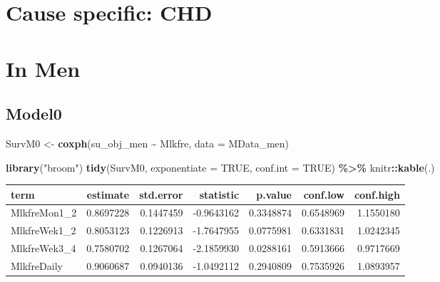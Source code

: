 \documentclass[
]{article}
\newenvironment{Shaded}{\begin{snugshade}}{\end{snugshade}}
\newcommand{\CommentTok}[1]{\textcolor[rgb]{0.56,0.35,0.01}{\textit{#1}}}
\newcommand{\DataTypeTok}[1]{\textcolor[rgb]{0.13,0.29,0.53}{#1}}
\newcommand{\KeywordTok}[1]{\textcolor[rgb]{0.13,0.29,0.53}{\textbf{#1}}}
\newcommand{\NormalTok}[1]{#1}
\newcommand{\OperatorTok}[1]{\textcolor[rgb]{0.81,0.36,0.00}{\textbf{#1}}}
\newcommand{\OtherTok}[1]{\textcolor[rgb]{0.56,0.35,0.01}{#1}}
\newcommand{\StringTok}[1]{\textcolor[rgb]{0.31,0.60,0.02}{#1}}
\begin{document}
\hypertarget{cause-specific-chd}{%
\section{Cause specific: CHD}\label{cause-specific-chd}}

\begin{Shaded}
\end{Shaded}

\hypertarget{in-men-3}{%
\section{In Men}\label{in-men-3}}

\hypertarget{model0-7}{%
\subsection{Model0}\label{model0-7}}

\begin{Shaded}
\begin{Highlighting}[]
\NormalTok{SurvM0 \textless{}{-}}\StringTok{  }\KeywordTok{coxph}\NormalTok{(su\_obj\_men }\OperatorTok{\textasciitilde{}}\StringTok{ }\NormalTok{Mlkfre, }
                 \DataTypeTok{data =}\NormalTok{ MData\_men)}

\KeywordTok{library}\NormalTok{(}\StringTok{"broom"}\NormalTok{)}
\KeywordTok{tidy}\NormalTok{(SurvM0, }\DataTypeTok{exponentiate =} \OtherTok{TRUE}\NormalTok{, }\DataTypeTok{conf.int =} \OtherTok{TRUE}\NormalTok{) }\OperatorTok{\%\textgreater{}\%}\StringTok{ }
\StringTok{  }\NormalTok{knitr}\OperatorTok{::}\KeywordTok{kable}\NormalTok{(.)}
\end{Highlighting}
\end{Shaded}

\begin{longtable}[]{@{}lrrrrrr@{}}
\toprule
term & estimate & std.error & statistic & p.value & conf.low &
conf.high\tabularnewline
\midrule
\endhead
MlkfreMon1\_2 & 0.8697228 & 0.1447459 & -0.9643162 & 0.3348874 &
0.6548969 & 1.1550180\tabularnewline
MlkfreWek1\_2 & 0.8053123 & 0.1226913 & -1.7647955 & 0.0775981 &
0.6331831 & 1.0242345\tabularnewline
MlkfreWek3\_4 & 0.7580702 & 0.1267064 & -2.1859930 & 0.0288161 &
0.5913666 & 0.9717669\tabularnewline
MlkfreDaily & 0.9060687 & 0.0940136 & -1.0492112 & 0.2940809 & 0.7535926
& 1.0893957\tabularnewline
\bottomrule
\end{longtable}
\end{document}
